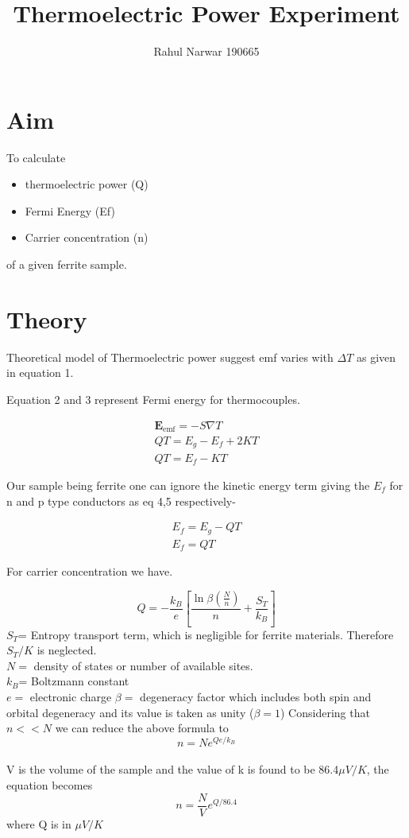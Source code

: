 \documentclass{article}
\title{Thermoelectric Power Experiment}
\author{Rahul Narwar 190665 }
\begin{document}
\maketitle

\section{Aim}

To calculate 
\begin{itemize}
    \item thermoelectric power (Q) 
    \item Fermi Energy (Ef) 
    \item Carrier concentration (n)
\end{itemize} of a given ferrite sample.

\section{Theory}

Theoretical model of Thermoelectric power suggest emf varies with $\Delta T$ as given in equation 1.

Equation 2 and 3 represent Fermi energy for thermocouples.

\begin{align}
    \mathbf E_\text{emf} = -S \nabla T\\
    QT = E_g-E_f+2KT\\
    QT = E_f-KT
\end{align}

Our sample being ferrite one can ignore the kinetic energy term giving the $E_f$ for n and p type conductors as eq 4,5 respectively-

\begin{align}
    E_f=E_g - QT\\
    E_f= QT
\end{align}

For carrier concentration we have.

\begin{equation}
    Q = - \frac{k_B}{e} \left[ \frac{\ln\beta\left(\frac{N}{n}\right)}{n} + \frac{S_T}{k_B}\right]
\end{equation}
$S_T$= Entropy transport term, which is negligible for ferrite materials. Therefore $S_T/K$ is neglected.\\
$N=$ density of states or number of available sites. \\
$k_B$= Boltzmann constant \\
$e =$ electronic charge
$\beta =$ degeneracy factor which includes both spin and orbital degeneracy and its value is taken as unity ($\beta=1$)
Considering that$n<<N$ we can reduce the above formula to
\begin{equation}
    n = N e^{Qe/k_B}
\end{equation}
\\
V is the volume of the sample and the value of k is found to be 86.4$\mu V/K$, the equation becomes
\\
\begin{equation}
    n = \frac{N}{V}e^{Q/86.4}
\end{equation}
where Q is in $\mu V/K$
\end{document}
